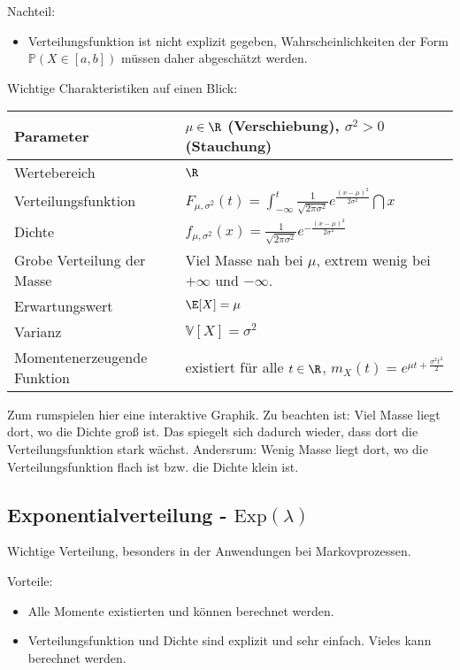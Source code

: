 {Nachteil:}
\begin{itemize}
	\item Verteilungsfunktion ist nicht explizit gegeben, Wahrscheinlichkeiten der Form $\mathbb P(X\in [a,b])$ m\"ussen daher abgesch\"atzt werden.
\end{itemize}

Wichtige Charakteristiken auf einen Blick:
\begin{center}
\begin{tabular}[h]{|l|l|}
\hline
Parameter& $\mu\in \R$ (Verschiebung), $\sigma^2>0$ (Stauchung)\\
\hline
Wertebereich & $\R$\\
\hline
Verteilungsfunktion & $F_{\mu,\sigma^2}(t)=\int_{-\infty}^t \frac{1}{\sqrt{2\pi \sigma^2}} e^{\frac{(x-\mu)^2}{2 \sigma^2}} \dint x$ \\
\hline
Dichte & $f_{\mu,\sigma^2}(x)=\frac{1}{\sqrt{2\pi \sigma^2}} e^{-\frac{(x-\mu)^2}{2\sigma^2}}$\\
\hline
Grobe Verteilung der Masse & Viel Masse nah bei $\mu$, extrem wenig bei $+\infty$ und $-\infty$.\\
\hline
Erwartungswert& $\E[X]=\mu$ \\
\hline
Varianz & $\mathbb V[X]=\sigma^2$\\
\hline
Momentenerzeugende Funktion& existiert f\"ur alle $t\in\R$, $m_X(t)=e^{\mu t +\frac{\sigma^2 t^2}{2}}$\\
\hline
\end{tabular}
\end{center}
Zum rumspielen hier eine interaktive Graphik. Zu beachten ist: Viel Masse liegt dort, wo die Dichte gro\ss{} ist. Das spiegelt sich dadurch wieder, dass dort die Verteilungsfunktion stark w\"achst. Andersrum: Wenig Masse liegt dort, wo die Verteilungsfunktion flach ist bzw. die Dichte klein ist. 



\subsection{Exponentialverteilung - $\text{Exp}(\lambda)$}

Wichtige Verteilung, besonders in der Anwendungen bei Markovprozessen.\smallskip

{Vorteile:} 
\begin{itemize}
\item Alle Momente existierten und k\"onnen berechnet werden.
\item Verteilungsfunktion und Dichte sind explizit und sehr einfach. Vieles kann berechnet werden.
\end{itemize}

